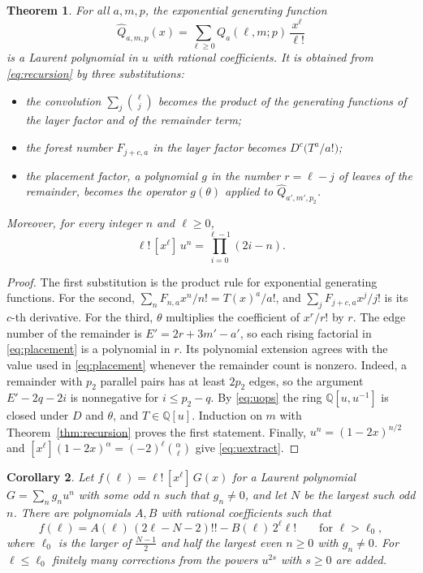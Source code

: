 \documentclass[11pt,a4paper]{article}
\newtheorem{theorem}{Theorem}[section]
\newtheorem{corollary}[theorem]{Corollary}
\theoremstyle{definition}
\begin{document}
\begin{theorem}\label{thm:closure}
For all $a,m,p$, the exponential generating function
\[
\widehat Q_{a,m,p}(x)=\sum_{\ell\ge0}Q_a(\ell,m;p)\,\frac{x^\ell}{\ell!}
\]
is a Laurent polynomial in $u$ with rational coefficients. It is obtained from \eqref{eq:recursion} by three substitutions:
\begin{itemize}
\item the convolution $\sum_j\binom{\ell}{j}$ becomes the product of the generating functions of the layer factor and of the remainder term;
\item the forest number $F_{j+c,a}$ in the layer factor becomes $D^{c}\bigl(T^a/a!\bigr)$;
\item the placement factor, a polynomial $g$ in the number $r=\ell-j$ of leaves of the remainder, becomes the operator $g(\theta)$ applied to $\widehat Q_{a',m',p_2}$.
\end{itemize}
Moreover, for every integer $n$ and $\ell\ge0$,
\begin{equation}\label{eq:uextract}
\ell!\,[x^\ell]\,u^n=\prod_{i=0}^{\ell-1}(2i-n).
\end{equation}
\end{theorem}

\begin{proof}
The first substitution is the product rule for exponential generating functions. For the second, $\sum_nF_{n,a}x^n/n!=T(x)^a/a!$, and $\sum_jF_{j+c,a}x^j/j!$ is its $c$-th derivative. For the third, $\theta$ multiplies the coefficient of $x^r/r!$ by $r$. The edge number of the remainder is $E'=2r+3m'-a'$, so each rising factorial in \eqref{eq:placement} is a polynomial in $r$. Its polynomial extension agrees with the value used in \eqref{eq:placement} whenever the remainder count is nonzero. Indeed, a remainder with $p_2$ parallel pairs has at least $2p_2$ edges, so the argument $E'-2q-2i$ is nonnegative for $i\le p_2-q$. By \eqref{eq:uops} the ring $\mathbb{Q}[u,u^{-1}]$ is closed under $D$ and $\theta$, and $T\in\mathbb{Q}[u]$. Induction on $m$ with Theorem~\ref{thm:recursion} proves the first statement. Finally, $u^n=(1-2x)^{n/2}$ and $[x^\ell](1-2x)^{\alpha}=(-2)^\ell\binom{\alpha}{\ell}$ give \eqref{eq:uextract}.
\end{proof}

\begin{corollary}\label{cor:shape}
Let $f(\ell)=\ell!\,[x^\ell]\,G(x)$ for a Laurent polynomial $G=\sum_ng_nu^n$ with some odd $n$ such that $g_n\ne0$, and let $N$ be the largest such odd $n$. There are polynomials $A,B$ with rational coefficients such that
\[
f(\ell)=A(\ell)\,(2\ell-N-2)!!-B(\ell)\,2^\ell\ell!\qquad\text{for }\ell>\ell_0,
\]
where $\ell_0$ is the larger of $\frac{N-1}{2}$ and half the largest even $n\ge0$ with $g_n\ne0$. For $\ell\le\ell_0$ finitely many corrections from the powers $u^{2s}$ with $s\ge0$ are added.
\end{corollary}
\end{document}
